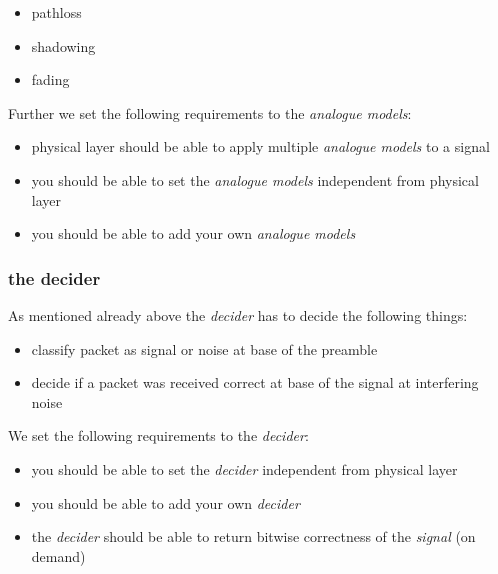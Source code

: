 \begin{itemize}
 \item pathloss
 \item shadowing
 \item fading
\end{itemize}

Further we set the following requirements to the \textit{analogue models}:

\begin{itemize}
 \item physical layer should be able to apply multiple \textit{analogue models} to a signal
 \item you should be able to set the \textit{analogue models} independent from physical layer
 \item you should be able to add your own \textit{analogue models}
\end{itemize}

\subsubsection{the decider}
\label{decider}

As mentioned already above the \textit{decider} has to decide the following things:

\begin{itemize}
\item classify packet as signal or noise at base of the preamble
\item decide if a packet was received correct at base of the signal at interfering noise
\end{itemize}

We set the following requirements to the \textit{decider}:

\begin{itemize}
 \item you should be able to set the \textit{decider} independent from physical layer
 \item you should be able to add your own \textit{decider}
 \item the \textit{decider} should be able to return bitwise correctness of the \textit{signal} (on demand)
\end{itemize}


